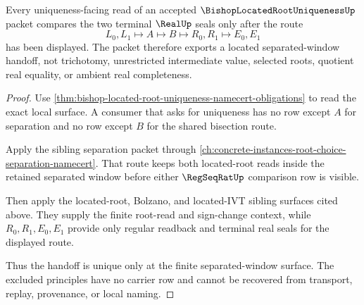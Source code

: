 \begin{theorem}
\label{thm:bishop-located-root-uniqueness-separation-route}
Every uniqueness-facing read of an accepted $\BishopLocatedRootUniquenessUp$ packet compares the two terminal $\RealUp$ seals only after the route
$$
L_0,L_1 \longmapsto A \longmapsto B \longmapsto R_0,R_1 \longmapsto E_0,E_1
$$
has been displayed. The packet therefore exports a located separated-window handoff, not trichotomy, unrestricted intermediate value, selected roots, quotient real equality, or ambient real completeness.
\end{theorem}
\begin{proof}
Use \autoref{thm:bishop-located-root-uniqueness-namecert-obligations} to read the exact local surface. A consumer that asks for uniqueness has no row except $A$ for separation and no row except $B$ for the shared bisection route.

Apply the sibling separation packet through \autoref{ch:concrete-instances-root-choice-separation-namecert}. That route keeps both located-root reads inside the retained separated window before either $\RegSeqRatUp$ comparison row is visible.

Then apply the located-root, Bolzano, and located-IVT sibling surfaces cited above. They supply the finite root-read and sign-change context, while $R_0,R_1,E_0,E_1$ provide only regular readback and terminal real seals for the displayed route.

Thus the handoff is unique only at the finite separated-window surface. The excluded principles have no carrier row and cannot be recovered from transport, replay, provenance, or local naming.
\end{proof}




